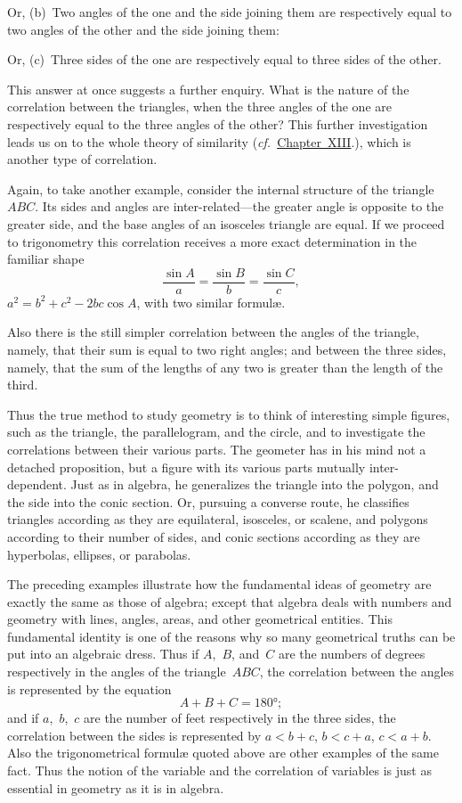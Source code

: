 \documentclass[12pt,leqno]{book}[2005/09/16]
\newcommand{\Chg}[2]{#2}
\newcommand{\Add}[1]{\Chg{}{#1}}
\newcommand{\ChapRef}[2][Chapter]{\hyperref[chapter:#2]{\Chg{#1}{Chapter}~#2}}
\newcommand{\PageSep}[1]{\ignorespaces}
\newcommand{\cf}{\emph{cf.}}
\begin{document}
Or, (b)~Two angles of the one and the side
joining them are respectively equal to two
angles of the other and the side joining them:

Or, (c)~Three sides of the one are respectively
equal to three sides of the other.

This answer at once suggests a further enquiry.
What is the nature of the correlation
between the triangles, when the three angles
of the one are respectively equal to the three
angles of the other? This further investigation
leads us on to the whole theory of similarity
%
\PageSep{238}
(\Chg{cf.}{\cf}\ \ChapRef{XIII}.), which is another
type of correlation.

Again, to take another example, consider
the internal structure of the triangle~$ABC$.
Its sides and angles are inter-related---the
greater angle is opposite to the greater side,
and the base angles of an isosceles triangle
are equal. If we proceed to trigonometry
this correlation receives a more exact determination
in the familiar shape
\[
\frac{\sin A}{a} = \frac{\sin B}{b} = \frac{\sin C}{c},
\]
$a^{2} = b^{2} + c^{2} - 2bc \cos A$, with two similar
formulæ.

Also there is the still simpler correlation
between the angles of the triangle, namely,
that their sum is equal to two right angles;
and between the three sides, namely, that the
sum of the lengths of any two is greater than
the length of the third\Add{.}

Thus the true method to study geometry is
to think of interesting simple figures, such as
the triangle, the parallelogram, and the circle,
and to investigate the correlations between
their various parts. The geometer has in his
mind not a detached proposition, but a figure
with its various parts mutually inter-dependent.
Just as in algebra, he generalizes the
triangle into the polygon, and the side into
\PageSep{239}
the conic section. Or, pursuing a converse
route, he classifies triangles according as they
are equilateral, isosceles, or scalene, and
polygons according to their number of sides,
and conic sections according as they are hyperbolas,
ellipses, or parabolas.

The preceding examples illustrate how the
fundamental ideas of geometry are exactly
the same as those of algebra; except that
algebra deals with numbers and geometry
with lines, angles, areas, and other geometrical
entities. This fundamental identity
is one of the reasons why so many geometrical
truths can be put into an algebraic dress.
Thus if $A$,~$B$, and~$C$ are the numbers of degrees
respectively in the angles of the triangle~$ABC$,
the correlation between the angles is represented
by the equation
\[
A + B + C = 180°;
\]
and if $a$,~$b$,~$c$ are the number of feet respectively
in the three sides, the correlation between the
sides is represented by $a < b + c$, $b < c + a$,
$c < a + b$. Also the trigonometrical formulæ
quoted above are other examples of the same
%
fact. Thus the notion of the variable and
the correlation of variables is just as essential
in geometry as it is in algebra.
\end{document}
